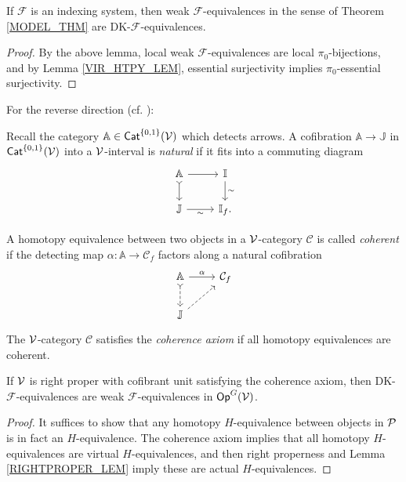 \documentclass[a4paper,10pt
,draft
]{article}%
\renewcommand{\F}{\mathcal F}
\newcommand{\I}{\mathbb I}
\newcommand{\J}{\mathbb J}
\renewcommand{\1}{\ensuremath{\mathbb{id}}}
\begin{document}
\begin{proposition}
      If $\F$ is an indexing system, then
      weak $\F$-equivalences in the sense of Theorem \ref{MODEL_THM} are DK-$\F$-equivalences.
\end{proposition}
\begin{proof}
      By the above lemma, local weak $\F$-equivalences are local $\pi_0$-bijections,
      and by Lemma \ref{VIR_HTPY_LEM}, essential surjectivity implies $\pi_0$-essential surjectivity. 
\end{proof}

For the reverse direction (cf. \cite[\S 2]{BM13}):
\begin{definition}
      Recall the category $\mathbb A \in \Cat^{\set{0,1}}(\V)$ which detects arrows.
      A cofibration $\mathbb A \to \J$ in $\Cat^{\set{0,1}}(\V)$ into a $\V$-interval is \textit{natural} if
      it fits into a commuting diagram
      \begin{equation}
            \begin{tikzcd}
                  \mathbb A \arrow[d, tail] \arrow[r]
                  &
                  \I \arrow[d, "\sim"]
                  \\
                  \J \arrow[r, "\sim"']
                  &
                  \I_f.
            \end{tikzcd}
      \end{equation}

      A homotopy equivalence between two objects in a $\V$-category $\mathcal C$ is called \textit{coherent} if
      the detecting map $\alpha: \mathbb A \to \mathcal C_f$ factors along a natural cofibration
      \begin{equation}
            \begin{tikzcd}
                  \mathbb A \arrow[r, "\alpha"] \arrow[d, tail, dashed]
                  &
                  \mathcal C_f
                  \\
                  \J \arrow[ur, dashed]
            \end{tikzcd}
      \end{equation}
      The $\V$-category $\mathcal C$ satisfies the \textit{coherence axiom} if all homotopy equivalences are coherent.
\end{definition}

\begin{proposition}
      If $\V$ is right proper with cofibrant unit satisfying the coherence axiom, then
      DK-$\F$-equivalences are weak $\F$-equivalences in $\Op^G(\V)$.
\end{proposition}
\begin{proof}
      It suffices to show that any homotopy $H$-equivalence between objects in $\P$ is in fact an $H$-equivalence.
      The coherence axiom implies that all homotopy $H$-equivalences are virtual $H$-equivalences, and then
      right properness and Lemma \ref{RIGHTPROPER_LEM} imply these are actual $H$-equivalences.
\end{proof}
\end{document}

